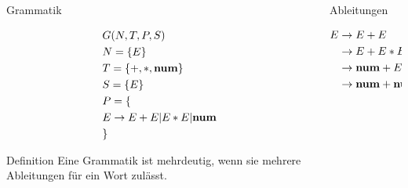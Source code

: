 \documentclass[t]{beamer}
\begin{document}
    \begin{frame}
        \vspace{-1em}
        \begin{columns}[T]
            \begin{column}{0.50\textwidth}
                \centering
                \begin{block}{Grammatik}
                    \vspace{-1em}
                    \begin{minipage}[t]{\linewidth}
                        \begin{align*}
                            & G(N,T,P,S) \\
                            & N= \{E\} \\
                            & T= \{+, *, \bold{num}\} \\
                            & S= \{E\}  \\
                            & P = \{ \\
                            & E \rightarrow E + E | E * E | \bold{num} \\
                            & \}
                        \end{align*}
                    \end{minipage}
                \end{block}
                \bigskip
                \begin{block}{Definition\cite{softwarelanguage}}
                    Eine Grammatik ist mehrdeutig, wenn sie mehrere Ableitungen für ein Wort zulässt.
                \end{block}
            \end{column}
            \begin{column}{0.33\textwidth}
                \centering
                \begin{block}{Ableitungen}
                    \vspace{-1em}
                    \begin{minipage}[t]{\linewidth}
                        \begin{align*}
                            & E \rightarrow E + E \\
                            & \phantom{E} \rightarrow E + E * E \\
                            & \phantom{E} \rightarrow \bold{num} + E * E \\
                            & \phantom{E} \rightarrow \bold{num} + \bold{num} * E \\

\end{align*}
\end{minipage}
\end{block}
\end{column}
\end{columns}
\end{frame}
\end{document}
